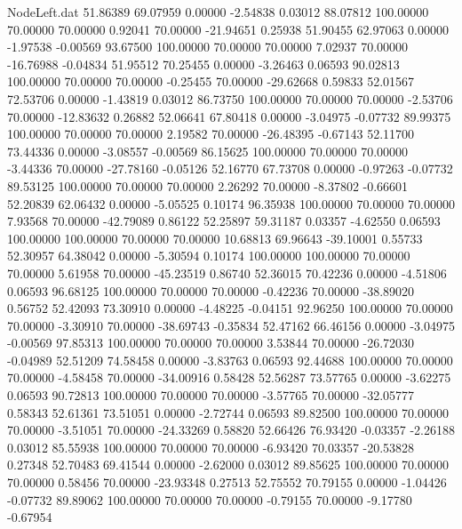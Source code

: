 \begin{filecontents}{NodeLeft.dat}
  51.86389   69.07959    0.00000    -2.54838    0.03012   88.07812  100.00000   70.00000   70.00000    0.92041   70.00000  -21.94651    0.25938
  51.90455   62.97063    0.00000    -1.97538   -0.00569   93.67500  100.00000   70.00000   70.00000    7.02937   70.00000  -16.76988   -0.04834
  51.95512   70.25455    0.00000    -3.26463    0.06593   90.02813  100.00000   70.00000   70.00000   -0.25455   70.00000  -29.62668    0.59833
  52.01567   72.53706    0.00000    -1.43819    0.03012   86.73750  100.00000   70.00000   70.00000   -2.53706   70.00000  -12.83632    0.26882
  52.06641   67.80418    0.00000    -3.04975   -0.07732   89.99375  100.00000   70.00000   70.00000    2.19582   70.00000  -26.48395   -0.67143
  52.11700   73.44336    0.00000    -3.08557   -0.00569   86.15625  100.00000   70.00000   70.00000   -3.44336   70.00000  -27.78160   -0.05126
  52.16770   67.73708    0.00000    -0.97263   -0.07732   89.53125  100.00000   70.00000   70.00000    2.26292   70.00000   -8.37802   -0.66601
  52.20839   62.06432    0.00000    -5.05525    0.10174   96.35938  100.00000   70.00000   70.00000    7.93568   70.00000  -42.79089    0.86122
  52.25897   59.31187    0.03357    -4.62550    0.06593  100.00000  100.00000   70.00000   70.00000   10.68813   69.96643  -39.10001    0.55733
  52.30957   64.38042    0.00000    -5.30594    0.10174  100.00000  100.00000   70.00000   70.00000    5.61958   70.00000  -45.23519    0.86740
  52.36015   70.42236    0.00000    -4.51806    0.06593   96.68125  100.00000   70.00000   70.00000   -0.42236   70.00000  -38.89020    0.56752
  52.42093   73.30910    0.00000    -4.48225   -0.04151   92.96250  100.00000   70.00000   70.00000   -3.30910   70.00000  -38.69743   -0.35834
  52.47162   66.46156    0.00000    -3.04975   -0.00569   97.85313  100.00000   70.00000   70.00000    3.53844   70.00000  -26.72030   -0.04989
  52.51209   74.58458    0.00000    -3.83763    0.06593   92.44688  100.00000   70.00000   70.00000   -4.58458   70.00000  -34.00916    0.58428
  52.56287   73.57765    0.00000    -3.62275    0.06593   90.72813  100.00000   70.00000   70.00000   -3.57765   70.00000  -32.05777    0.58343
  52.61361   73.51051    0.00000    -2.72744    0.06593   89.82500  100.00000   70.00000   70.00000   -3.51051   70.00000  -24.33269    0.58820
  52.66426   76.93420   -0.03357    -2.26188    0.03012   85.55938  100.00000   70.00000   70.00000   -6.93420   70.03357  -20.53828    0.27348
  52.70483   69.41544    0.00000    -2.62000    0.03012   89.85625  100.00000   70.00000   70.00000    0.58456   70.00000  -23.93348    0.27513
  52.75552   70.79155    0.00000    -1.04426   -0.07732   89.89062  100.00000   70.00000   70.00000   -0.79155   70.00000   -9.17780   -0.67954

\end{filecontents}
